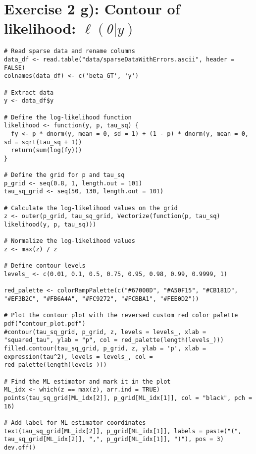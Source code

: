 \section*{Exercise 2 g): Contour of likelihood: $\ell(\theta|y)$}
\begin{tcolorbox}[colback=white!95!black,colframe=white!50!black]
\begin{lstlisting}[caption={Exercise 2g}, label={lst:contour_plot}]
# Read sparse data and rename columns
data_df <- read.table("data/sparseDataWithErrors.ascii", header = FALSE)
colnames(data_df) <- c('beta_GT', 'y')

# Extract data
y <- data_df$y

# Define the log-likelihood function
likelihood <- function(y, p, tau_sq) {
  fy <- p * dnorm(y, mean = 0, sd = 1) + (1 - p) * dnorm(y, mean = 0, sd = sqrt(tau_sq + 1))
  return(sum(log(fy)))
}

# Define the grid for p and tau_sq
p_grid <- seq(0.8, 1, length.out = 101)
tau_sq_grid <- seq(50, 130, length.out = 101)

# Calculate the log-likelihood values on the grid
z <- outer(p_grid, tau_sq_grid, Vectorize(function(p, tau_sq) likelihood(y, p, tau_sq)))

# Normalize the log-likelihood values
z <- max(z) / z

# Define contour levels
levels_ <- c(0.01, 0.1, 0.5, 0.75, 0.95, 0.98, 0.99, 0.9999, 1)

red_palette <- colorRampPalette(c("#67000D", "#A50F15", "#CB181D", "#EF3B2C", "#FB6A4A", "#FC9272", "#FCBBA1", "#FEE0D2"))

# Plot the contour plot with the reversed custom red color palette
pdf("contour_plot.pdf")
#contour(tau_sq_grid, p_grid, z, levels = levels_, xlab = "squared_tau", ylab = "p", col = red_palette(length(levels_)))
filled.contour(tau_sq_grid, p_grid, z, ylab = 'p', xlab = expression(tau^2), levels = levels_, col = red_palette(length(levels_))) 

# Find the ML estimator and mark it in the plot
ML_idx <- which(z == max(z), arr.ind = TRUE)
points(tau_sq_grid[ML_idx[2]], p_grid[ML_idx[1]], col = "black", pch = 16)

# Add label for ML estimator coordinates
text(tau_sq_grid[ML_idx[2]], p_grid[ML_idx[1]], labels = paste("(", tau_sq_grid[ML_idx[2]], ",", p_grid[ML_idx[1]], ")"), pos = 3)
dev.off()
\end{lstlisting}
\end{tcolorbox}
\vspace{20mm}
